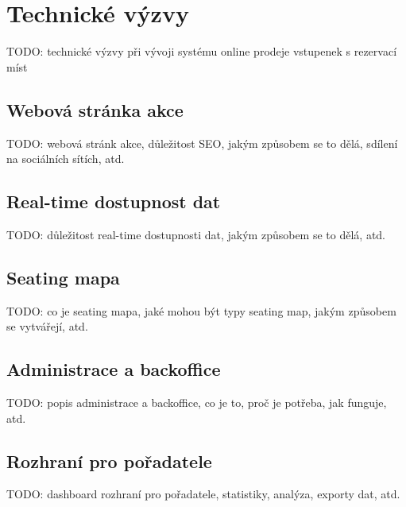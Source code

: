 \chapter{Technické výzvy}
TODO: technické výzvy při vývoji systému online prodeje vstupenek s rezervací míst

\section{Webová stránka akce}
TODO: webová stránk akce, důležitost SEO, jakým způsobem se to dělá, sdílení na sociálních sítích, atd.

\section{Real-time dostupnost dat}
TODO: důležitost real-time dostupnosti dat, jakým způsobem se to dělá, atd.

\section{Seating mapa}
TODO: co je seating mapa, jaké mohou být typy seating map, jakým způsobem se vytvářejí, atd.

\section{Administrace a backoffice}
TODO: popis administrace a backoffice, co je to, proč je potřeba, jak funguje, atd.

\section{Rozhraní pro pořadatele}
TODO: dashboard rozhraní pro pořadatele, statistiky, analýza, exporty dat, atd.

